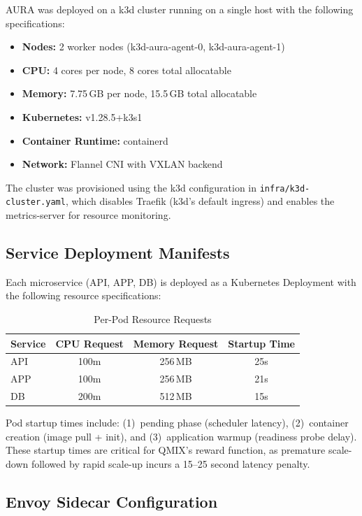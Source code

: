 \documentclass[conference]{IEEEtran}
\begin{document}
AURA was deployed on a k3d cluster running on a single host with the
following specifications:
\begin{itemize}
\item \textbf{Nodes:} 2 worker nodes (k3d-aura-agent-0, k3d-aura-agent-1)
\item \textbf{CPU:} 4 cores per node, 8 cores total allocatable
\item \textbf{Memory:} 7.75\,GB per node, 15.5\,GB total allocatable
\item \textbf{Kubernetes:} v1.28.5+k3s1
\item \textbf{Container Runtime:} containerd
\item \textbf{Network:} Flannel CNI with VXLAN backend
\end{itemize}

The cluster was provisioned using the k3d configuration in
\texttt{infra/k3d-cluster.yaml}, which disables Traefik (k3d's default
ingress) and enables the metrics-server for resource monitoring.

\subsection{Service Deployment Manifests}

Each microservice (API, APP, DB) is deployed as a Kubernetes Deployment
with the following resource specifications:

\begin{table}[h]
\centering
\caption{Per-Pod Resource Requests}
\label{tab:pod-resources}
\setlength{\tabcolsep}{6pt}
\begin{tabular}{lccc}
\toprule
\textbf{Service} & \textbf{CPU Request} & \textbf{Memory Request} & \textbf{Startup Time} \\
\midrule
API & 100m & 256\,MB & 25s \\
APP & 100m & 256\,MB & 21s \\
DB & 200m & 512\,MB & 15s \\
\bottomrule
\end{tabular}
\end{table}

Pod startup times include: (1)~pending phase (scheduler latency),
(2)~container creation (image pull + init), and (3)~application warmup
(readiness probe delay). These startup times are critical for QMIX's
reward function, as premature scale-down followed by rapid scale-up
incurs a 15--25 second latency penalty.

\subsection{Envoy Sidecar Configuration}
\end{document}
